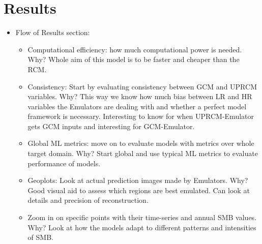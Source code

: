 \documentclass[a4paper,11pt,oneside]{report}
\begin{document}

\chapter{Results}

\begin{itemize}
    \item Flow of Results section:
    \begin{itemize}
    \item Computational efficiency: how much computational power is needed. Why? Whole aim of this model is to be faster and cheaper than the RCM. 
    \item Consistency: Start by evaluating consistency between GCM and UPRCM variables. Why? This way we know how much bias between LR and HR variables the Emulators are dealing with and whether a perfect model framework is necessary. Interesting to know for when UPRCM-Emulator gets GCM inputs and interesting for GCM-Emulator. 
        \item Global ML metrics: move on to evaluate models with metrics over whole target domain. Why? Start global and use typical ML metrics to evaluate performance of models.  
        \item Geoplots: Look at actual prediction images made by Emulators. Why? Good visual aid to assess which regions are best emulated. Can look at details and precision of reconstruction.   
        \item Zoom in on specific points with their time-series and annual SMB values. Why? Look at how the models adapt to different patterns and intensities of SMB. 
    \end{itemize} 
\end{itemize}
\end{document}
